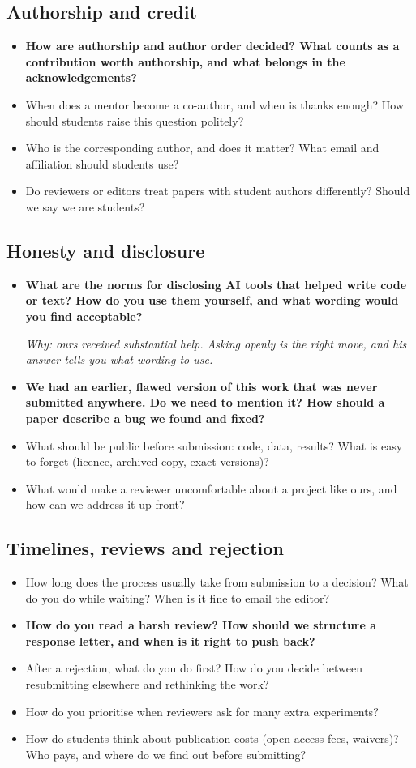 \documentclass[10.5pt]{article}
\newcommand{\Q}[1]{\item[$\square$] #1}
\newcommand{\QS}[1]{\item[\textbf{$\star$}] \textbf{#1}}
\newcommand{\why}[1]{\par{\small\itshape\color{note}Why: #1}}
\begin{document}
\subsection*{Authorship and credit}
\begin{itemize}
\QS{How are authorship and author order decided? What counts as a contribution worth authorship, and what belongs in the acknowledgements?}
\Q{When does a mentor become a co-author, and when is thanks enough? How should students raise this question politely?}
\Q{Who is the corresponding author, and does it matter? What email and affiliation should students use?}
\Q{Do reviewers or editors treat papers with student authors differently? Should we say we are students?}
\end{itemize}

\subsection*{Honesty and disclosure}
\begin{itemize}
\QS{What are the norms for disclosing AI tools that helped write code or text? How do you use them yourself, and what wording would you find acceptable?}
\why{ours received substantial help. Asking openly is the right move, and his answer tells you what wording to use.}
\QS{We had an earlier, flawed version of this work that was never submitted anywhere. Do we need to mention it? How should a paper describe a bug we found and fixed?}
\Q{What should be public before submission: code, data, results? What is easy to forget (licence, archived copy, exact versions)?}
\Q{What would make a reviewer uncomfortable about a project like ours, and how can we address it up front?}
\end{itemize}

\subsection*{Timelines, reviews and rejection}
\begin{itemize}
\Q{How long does the process usually take from submission to a decision? What do you do while waiting? When is it fine to email the editor?}
\QS{How do you read a harsh review? How should we structure a response letter, and when is it right to push back?}
\Q{After a rejection, what do you do first? How do you decide between resubmitting elsewhere and rethinking the work?}
\Q{How do you prioritise when reviewers ask for many extra experiments?}
\Q{How do students think about publication costs (open-access fees, waivers)? Who pays, and where do we find out before submitting?}
\end{itemize}
\end{document}
